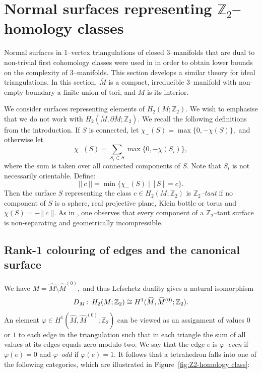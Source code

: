 \documentclass[a4paper]{gtart}
\def\manifold{M}
\def\closure{\overline{M}}
\def\Z{\mathbb{Z}}
\theoremstyle{plain}
\theoremstyle{definition}
\theoremstyle{remark}
\numberwithin{equation}{section}
\begin{document}

\section{Normal surfaces representing $\Z_2$--homology classes}
\label{sec:normsurfs}

Normal surfaces in 1--vertex triangulations of closed 3--manifolds that are dual to non-trivial first cohomology classes were used in \cite{Jaco-minimal-2009, Jaco-Z2-2013} in order to obtain lower bounds on the complexity of 3--manifolds. This section develops a similar theory for ideal triangulations. In this section, $\closure$ is a compact, irreducible 3--manifold with non-empty boundary a finite union of tori, and $\manifold$ is its interior. 

We consider surfaces representing elements of $H_2(\manifold; \Z_2).$ We wish to emphasise that we do not work with $H_2(\closure, \partial \closure; \Z_2).$ 
We recall the following definitions from the introduction.
If $S$ is connected, let $\chi_{-}(S) = \max \{ 0,-\chi(S)\},$ and otherwise let
\[\chi_{-}(S) = \sum_{S_i\subset S} \max \{ 0,-\chi(S_i)\},\]
where the sum is taken over all connected components of $S.$ Note that $S_i$ is not necessarily orientable. Define:
\[|| \ c \ || = \min \{ \chi_{-}(S) \mid [S]= c\}.\]
Then the surface $S$ representing the class $c \in H_2(\manifold;\Z_2)$ is \emph{$\Z_2$--taut} if no component of $S$ is a sphere, real projective plane, Klein bottle or torus and $\chi(S) = -|| \ c \ ||.$ As in \cite{Thurston-norm-1986}, one observes that every component of a $\Z_2$--taut surface is non-separating and geometrically incompressible.

\subsection{Rank-1 colouring of edges and the canonical surface}
\label{subsec:colouring}

We have $\manifold = \widehat{\manifold}\setminus \widehat{\manifold}^{(0)},$ and thus Lefschetz duality gives a natural isomorphism 
\[D_\manifold \co H_2(\manifold; \Z_2) 
\cong H^1(\widehat{\manifold}, \widehat{\manifold}^{(0)}; \Z_2).\]
An element $\varphi \in H^1(\widehat{\manifold}, \widehat{\manifold}^{(0)}; \Z_2)$ can be viewed as an assignment of values $0$ or $1$ to each edge in the triangulation such that in each triangle the sum of all values at its edges equals zero modulo two. We say that the edge $e$ is \emph{$\varphi$--even} if $\varphi(e) = 0$ and \emph{$\varphi$--odd} if $\varphi(e) = 1.$
It follows that a tetrahedron falls into one of the following categories, which are illustrated in Figure~\ref{fig:Z2-homology class}:
\end{document}
